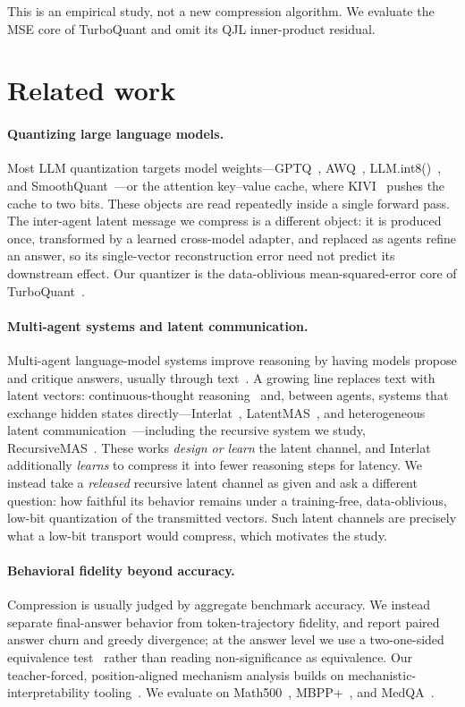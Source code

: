 \documentclass{article}
\begin{document}
This is an empirical study, not a new compression algorithm. We evaluate the MSE
core of TurboQuant and omit its QJL inner-product residual.

\section{Related work}

\paragraph{Quantizing large language models.}
Most LLM quantization targets model weights---GPTQ~\citep{gptq}, AWQ~\citep{awq},
LLM.int8()~\citep{llmint8}, and SmoothQuant~\citep{smoothquant}---or the attention
key--value cache, where KIVI~\citep{kivi} pushes the cache to two bits. These objects are
read repeatedly inside a single forward pass. The inter-agent latent message we compress is
a different object: it is produced once, transformed by a learned cross-model adapter, and
replaced as agents refine an answer, so its single-vector reconstruction error need not
predict its downstream effect. Our quantizer is the data-oblivious mean-squared-error core
of TurboQuant~\citep{turboquant2026}.

\paragraph{Multi-agent systems and latent communication.}
Multi-agent language-model systems improve reasoning by having models propose and critique
answers, usually through text~\citep{debate}. A growing line replaces text with latent vectors:
continuous-thought reasoning~\citep{coconut} and, between agents, systems that exchange hidden
states directly---Interlat~\citep{interlat}, LatentMAS~\citep{latentmas}, and heterogeneous
latent communication~\citep{visionwormhole}---including the recursive system we study,
RecursiveMAS~\citep{recursivemas2026}. These works \emph{design or learn} the latent channel, and
Interlat additionally \emph{learns} to compress it into fewer reasoning steps for latency. We
instead take a \emph{released} recursive latent channel as given and ask a different question: how
faithful its behavior remains under a training-free, data-oblivious, low-bit quantization of the
transmitted vectors. Such latent channels are precisely what a low-bit transport would compress,
which motivates the study.

\paragraph{Behavioral fidelity beyond accuracy.}
Compression is usually judged by aggregate benchmark accuracy. We instead separate
final-answer behavior from token-trajectory fidelity, and report paired answer churn and
greedy divergence; at the answer level we use a two-one-sided equivalence test~\citep{tost}
rather than reading non-significance as equivalence. Our teacher-forced, position-aligned
mechanism analysis builds on mechanistic-interpretability tooling~\citep{transformerlens}.
We evaluate on Math500~\citep{math}, MBPP+~\citep{mbpp}, and MedQA~\citep{medqa}.
\end{document}
